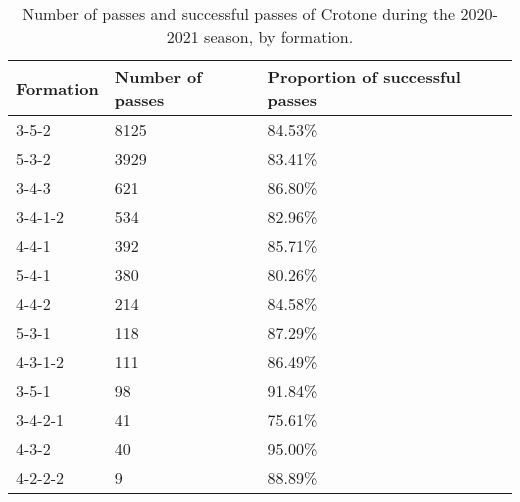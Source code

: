\begin{table}[!htbp]
\centering
\caption{Number of passes and successful passes of Crotone during the 2020-2021 season,
by formation.}
\begin{tabular}{@{}lll@{}}
\toprule
Formation & Number of passes & Proportion of successful passes \\ \midrule
3-5-2          & 8125        & 84.53\% \\
5-3-2          & 3929        & 83.41\% \\
3-4-3          & 621         & 86.80\% \\
3-4-1-2        & 534         & 82.96\% \\
4-4-1          & 392         & 85.71\% \\
5-4-1          & 380         & 80.26\% \\
4-4-2          & 214         & 84.58\% \\
5-3-1          & 118         & 87.29\% \\
4-3-1-2        & 111         & 86.49\% \\
3-5-1          & 98          & 91.84\% \\
3-4-2-1        & 41          & 75.61\% \\
4-3-2          & 40          & 95.00\% \\
4-2-2-2        & 9           & 88.89\% \\ \bottomrule
\end{tabular}

\label{tab:formation_crotone}
\end{table}